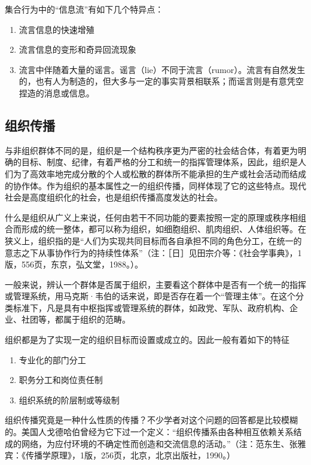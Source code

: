 \documentclass[UTF8,12pt]{ctexart}
\numberwithin{equation}{section} %
\numberwithin{figure}{section}
\numberwithin{table}{section}
\begin{document}
	集合行为中的“信息流”有如下几个特异点：
	\begin{enumerate}
		\item 流言信息的快速增殖
		
		\item 流言信息的变形和奇异回流现象
		
		\item 流言中伴随着大量的谣言。谣言（lie）不同于流言（rumor）。流言有自然发生的，也有人为制造的，但大多与一定的事实背景相联系；而谣言则是有意凭空捏造的消息或信息。
	\end{enumerate}
	
	
	\subsection{组织传播}
	与非组织群体不同的是，组织是一个结构秩序更为严密的社会结合体，有着更为明确的目标、制度、纪律，有着严格的分工和统一的指挥管理体系，因此，组织是人们为了高效率地完成分散的个人或松散的群体所不能承担的生产或社会活动而结成的协作体。作为组织的基本属性之一的组织传播，同样体现了它的这些特点。现代社会是高度组织化的社会，也是组织传播高度发达的社会。
	
	什么是组织从广义上来说，任何由若干不同功能的要素按照一定的原理或秩序相组合而形成的统一整体，都可以称为组织，如细胞组织、肌肉组织、人体组织等。在狭义上，组织指的是“人们为实现共同目标而各自承担不同的角色分工，在统一的意志之下从事协作行为的持续性体系”（注：［日］见田宗介等：《社会学事典》，1版，556页，东京，弘文堂，1988。）。
	
	一般来说，辨认一个群体是否属于组织，主要看这个群体中是否有一个统一的指挥或管理系统，用马克斯·韦伯的话来说，即是否存在着一个“管理主体”。在这个分类标准下，凡是具有中枢指挥或管理系统的群体，如政党、军队、政府机构、企业、社团等，都属于组织的范畴。
	
	组织都是为了实现一定的组织目标而设置或成立的。因此一般有着如下的特征
	\begin{enumerate}
		\item 专业化的部门分工
		
		\item 职务分工和岗位责任制
		
		\item 组织系统的阶层制或等级制
	\end{enumerate}
	
	组织传播究竟是一种什么性质的传播？不少学者对这个问题的回答都是比较模糊的。美国人戈德哈伯曾经为它下过一个定义：“组织传播系由各种相互依赖关系结成的网络，为应付环境的不确定性而创造和交流信息的活动。”（注：范东生、张雅宾：《传播学原理》，1版，256页，北京，北京出版社，1990。）
	
\end{document}
